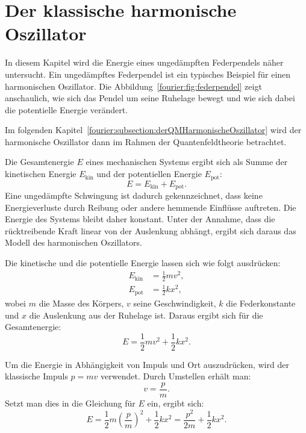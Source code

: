 %
%
%
%

\section{Der klassische harmonische Oszillator\label{fourier:section:derKlassischeHarmonischeOszillator}}

In diesem Kapitel wird die Energie eines ungedämpften Federpendels näher untersucht.
Ein ungedämpftes Federpendel ist ein typisches Beispiel für einen harmonischen Oszillator.
Die Abbildung~\ref{fourier:fig:federpendel} zeigt anschaulich, wie sich das Pendel um seine Ruhelage bewegt und wie sich dabei die potentielle Energie verändert.

Im folgenden Kapitel~\ref{fourier:subsection:derQMHarmonischeOszillator} wird der harmonische Oszillator dann im Rahmen der Quantenfeldtheorie betrachtet.

Die Gesamtenergie \( E \) eines mechanischen Systems ergibt sich als Summe der kinetischen Energie \( E_{\text{kin}} \) und der potentiellen Energie \( E_{\text{pot}} \):  
\begin{equation}  
	E = E_{\text{kin}} + E_{\text{pot}}.  
\end{equation}
Eine ungedämpfte Schwingung ist dadurch gekennzeichnet, dass keine Energieverluste durch Reibung oder andere hemmende Einflüsse auftreten.  
Die Energie des Systems bleibt daher konstant.  
Unter der Annahme, dass die rücktreibende Kraft linear von der Auslenkung abhängt, ergibt sich daraus das Modell des harmonischen Oszillators.

Die kinetische und die potentielle Energie lassen sich wie folgt ausdrücken:  
\begin{align}  
	E_{\text{kin}} &= \frac{1}{2} m v^2, \\  
	E_{\text{pot}} &= \frac{1}{2} k x^2,  
\end{align}  
wobei \( m \) die Masse des Körpers, \( v \) seine Geschwindigkeit, \( k \) die Federkonstante und \( x \) die Auslenkung aus der Ruhelage ist.
Daraus ergibt sich für die Gesamtenergie:  
\begin{equation}  
	E = \frac{1}{2} m v^2 + \frac{1}{2} k x^2.  
\end{equation}

Um die Energie in Abhängigkeit von Impuls und Ort auszudrücken, wird der klassische Impuls \( p = m v \) verwendet.  
Durch Umstellen erhält man:  
\[
	v = \frac{p}{m}.  
\]  
Setzt man dies in die Gleichung für \( E \) ein, ergibt sich:  
\begin{equation}\label{fourier:equation:derKlassischeHarmonischeOszillator}  
	E = \frac{1}{2} m {\left(\frac{p}{m}\right)}^{2} + \frac{1}{2} k x^{2} = \frac{p^{2}}{2m} + \frac{1}{2} k x^{2}.
\end{equation}

